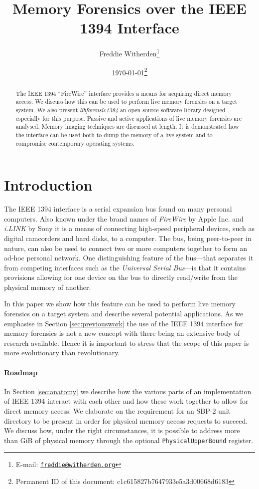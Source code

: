 \documentclass[numbers=noenddot,      %
               abstract,              %
               captions=tableheading, %
               DIV=8]                 %
              {scrartcl}
\newcommand{\mailto}[1]{\texttt{\href{mailto:#1}{#1}}}
\begin{document}
\title{Memory Forensics over the IEEE 1394 Interface}
\date{\today\footnote{Permanent ID of this document: c1c615827b7647933e5a3d00668d6183}}
\author{Freddie Witherden\footnote{E-mail: \mailto{freddie@witherden.org}}}
\maketitle

\begin{abstract}
  The IEEE 1394 ``FireWire'' interface provides a means for acquiring
  direct memory access.  We discuss how this can be used to perform live
  memory forensics on a target system. We also present
  \emph{libforensic1394} an open-source software library designed
  especially for this purpose. Passive and active applications of live
  memory forensics are analysed. Memory imaging techniques are discussed
  at length. It is demonstrated how the interface can be used both to
  dump the memory of a live system and to compromise contemporary
  operating systems.
\end{abstract}

\section{Introduction}
\label{sec:introduction}

The IEEE 1394 interface is a serial expansion bus found on many personal
computers. Also known under the brand names of \emph{FireWire} by Apple
Inc. and \emph{i.LINK} by Sony it is a means of connecting high-speed
peripheral devices, such as digital camcorders and hard disks, to a
computer. The bus, being peer-to-peer in nature, can also be used to
connect two or more computers together to form an ad-hoc personal
network. One distinguishing feature of the bus---that separates it from
competing interfaces such as the \emph{Universal Serial Bus}---is that
it contains provisions allowing for one device on the bus to directly
read/write from the physical memory of another.

In this paper we show how this feature can be used to perform live
memory forensics on a target system and describe several potential
applications.  As we emphasise in Section \ref{sec:previouswork} the use
of the IEEE 1394 interface for memory forensics is not a new concept
with there being an extensive body of research available. Hence it is
important to stress that the scope of this paper is more evolutionary
than revolutionary.

\paragraph{Roadmap}
In Section \ref{sec:anatomy} we describe how the various parts of an
implementation of IEEE 1394 interact with each other and how these work
together to allow for direct memory access. We elaborate on the
requirement for an SBP-2 unit directory to be present in order for
physical memory access requests to succeed. We discuss how, under the
right circumstances, it is possible to address more than \unit[4]{GiB}
of physical memory through the optional \verb:PhysicalUpperBound:
register.
\end{document}
